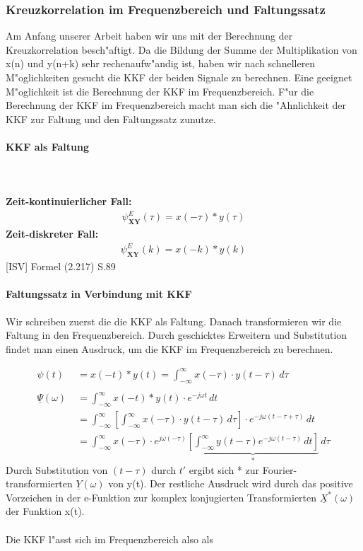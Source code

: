 \subsubsection{Kreuzkorrelation im Frequenzbereich und Faltungssatz}
Am Anfang unserer Arbeit haben wir uns mit der Berechnung der Kreuzkorrelation besch"aftigt. Da die Bildung der Summe der Multiplikation von x(n) und y(n+k) sehr rechenaufw"andig ist, haben wir nach schnelleren M"oglichkeiten gesucht die KKF der beiden Signale zu berechnen. Eine geeignet M"oglichkeit ist die Berechnung der KKF im Frequenzbereich. F"ur die Berechnung der KKF im Frequenzbereich macht man sich die "Ahnlichkeit der KKF zur Faltung und den Faltungssatz zunutze.

\paragraph{KKF als Faltung}
\textbf{\\\\Zeit-kontinuierlicher Fall:}
\begin{align}
\psi_{\textbf {XY}}^E(\tau) = x(-\tau) * y(\tau)
\end{align}
\textbf{Zeit-diskreter Fall:}
\begin{align}
\psi_{\textbf {XY}}^E(k) = x(-k) * y(k)
\end{align}
[ISV] Formel (2.217) S.89
\paragraph{Faltungssatz in Verbindung mit KKF \newline \newline} Wir schreiben zuerst die die KKF als Faltung. Danach transformieren wir die Faltung in den Frequenzbereich. Durch geschicktes Erweitern und Substitution findet man einen Ausdruck, um die KKF im Frequenzbereich zu berechnen.

\begin{align}
\psi(t) \  \; &= x(-t) * y(t) = \int_{-\infty}^{\infty} x(-\tau) \cdot y(t-\tau)\,d\tau\\\\
\underline \Psi(\omega) &=\int_{-\infty}^{\infty} x(-t) * y(t) \cdot e^{-j\omega t} \,dt\\&=\int_{-\infty}^{\infty} \left[ \int_{-\infty}^{\infty} x(-\tau) \cdot y(t-\tau)\,d\tau \right] \cdot e^{-j\omega (t - \tau + \tau)} \,dt\\&=\int_{-\infty}^{\infty} x(-\tau) \cdot e^{j\omega(-\tau)} \underbrace{ \left[ \int_{-\infty}^{\infty} y(t-\tau) e^{-j\omega (t - \tau)} \,dt \right]}_* \,d\tau
\end{align}
Durch Substitution von $(t-\tau)$ durch $t'$ ergibt sich * zur Fourier-transformierten $ \underline{Y}(\omega)$ von y(t). Der restliche Ausdruck wird durch das positive Vorzeichen in der e-Funktion zur komplex konjugierten Transformierten $ \underline{X}^*(\omega)$ der Funktion x(t).
\\\\
Die KKF l"asst sich im Frequenzbereich also als

